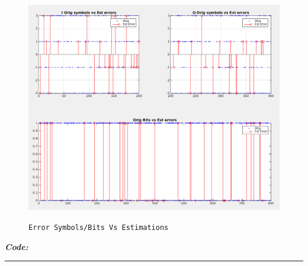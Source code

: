 \documentclass[11pt]{article}
\begin{document}
    \begin{figure}[H]
        \centering
        \includegraphics[scale=0.5, width=\textwidth]{img/A13_A15_errors.png} \\
        \caption{\texttt{Error Symbols/Bits Vs Estimations}}
    \end{figure}
    
%
%
%
\newpage

\textbf{\emph{Code:}} \\
\rule{\linewidth}{0.3mm} \\[0.1cm]
\end{document}
